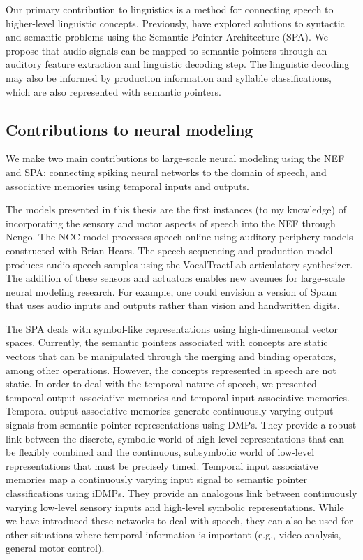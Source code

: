 Our primary contribution to linguistics
is a method for connecting speech
to higher-level linguistic concepts.
Previously, \citet{blouw2013,blouw2015,stewart2015}
have explored solutions to
syntactic and semantic problems
using the Semantic Pointer Architecture (SPA).
We propose that audio signals
can be mapped to semantic pointers
through an auditory feature extraction
and linguistic decoding step.
The linguistic decoding may also be informed
by production information
and syllable classifications,
which are also represented with semantic pointers.

\subsection{Contributions to neural modeling}

We make two main contributions to
large-scale neural modeling using the NEF and SPA:
connecting spiking neural networks
to the domain of speech,
and associative memories using
temporal inputs and outputs.

The models presented in this thesis
are the first instances (to my knowledge)
of incorporating the sensory and motor
aspects of speech into the NEF
through Nengo.
The NCC model processes speech online
using auditory periphery models
constructed with Brian Hears.
The speech sequencing and production model
produces audio speech samples
using the VocalTractLab articulatory synthesizer.
The addition of these sensors and actuators
enables new avenues
for large-scale neural modeling research.
For example,
one could envision a version of Spaun
that uses audio inputs and outputs
rather than vision and handwritten digits.

The SPA deals with symbol-like representations
using high-dimensonal vector spaces.
Currently, the semantic pointers
associated with concepts are
static vectors that can be manipulated
through the merging and binding operators,
among other operations.
However, the concepts represented in speech
are not static.
In order to deal with the temporal nature of speech,
we presented temporal output associative memories
and temporal input associative memories.
Temporal output associative memories
generate continuously varying output signals
from semantic pointer representations
using DMPs.
They provide a robust link between the discrete,
symbolic world of high-level representations
that can be flexibly combined
and the continuous, subsymbolic world
of low-level representations that must
be precisely timed.
Temporal input associative memories
map a continuously varying input signal
to semantic pointer classifications
using iDMPs.
They provide an analogous link between
continuously varying low-level sensory inputs
and high-level symbolic representations.
While we have introduced these networks
to deal with speech,
they can also be used for other
situations where temporal information
is important (e.g., video analysis,
general motor control).


